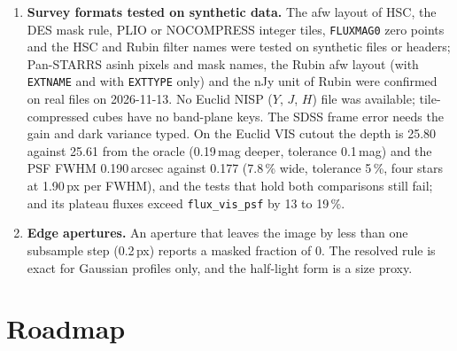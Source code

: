 \documentclass[11pt,a4paper]{article}
\newcommand{\code}[1]{\texttt{\small #1}}
\begin{document}
\begin{enumerate}[nosep]
    \item \textbf{Survey formats tested on synthetic data.} The afw layout of HSC, the DES mask rule, PLIO or NOCOMPRESS integer tiles, \code{FLUXMAG0} zero points and the HSC and Rubin filter names were tested on synthetic files or headers; Pan-STARRS asinh pixels and mask names, the Rubin afw layout (with \code{EXTNAME} and with \code{EXTTYPE} only) and the nJy unit of Rubin were confirmed on real files on 2026-11-13. No Euclid NISP ($Y$, $J$, $H$) file was available; tile-compressed cubes have no band-plane keys. The SDSS frame error needs the gain and dark variance typed. On the Euclid VIS cutout the depth is 25.80 against 25.61 from the oracle (0.19\,mag deeper, tolerance 0.1\,mag) and the PSF FWHM 0.190\,arcsec against 0.177 (7.8\,\% wide, tolerance 5\,\%, four stars at 1.90\,px per FWHM), and the tests that hold both comparisons still fail; and its plateau fluxes exceed \code{flux\_vis\_psf} by 13 to 19\,\%.
    \item \textbf{Edge apertures.} An aperture that leaves the image by less than one subsample step (0.2\,px) reports a masked fraction of 0. The resolved rule is exact for Gaussian profiles only, and the half-light form is a size proxy.
    \end{enumerate}


    \clearpage
    \section{Roadmap}
    \label{sec:roadmap}
\end{document}
